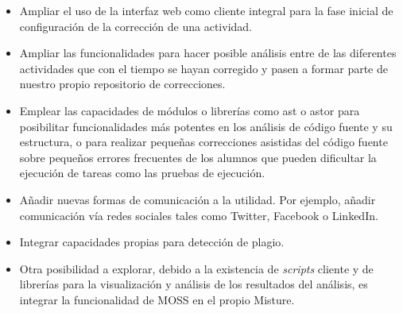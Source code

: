 \begin{itemize}
\item Ampliar el uso de la interfaz web como cliente integral para la fase inicial de configuración de la corrección de una actividad.\\

\item Ampliar las funcionalidades para hacer posible análisis entre de las diferentes actividades que con el tiempo se hayan corregido y pasen a formar parte de nuestro propio repositorio de correcciones.\\

\item Emplear las capacidades de módulos o librerías como ast o astor para posibilitar funcionalidades más potentes en los análisis de código fuente y su estructura, o para realizar pequeñas correcciones asistidas del código fuente sobre pequeños errores frecuentes de los alumnos que pueden dificultar la ejecución de tareas como las pruebas de ejecución.\\

\item Añadir nuevas formas de comunicación a la utilidad. Por ejemplo, añadir comunicación vía redes sociales tales como Twitter, Facebook o LinkedIn.\\

\item Integrar capacidades propias para detección de plagio.\\

\item Otra posibilidad a explorar, debido a la existencia de \textit{scripts} cliente y de librerías para la visualización y análisis de los resultados del análisis, es integrar la funcionalidad de MOSS en el propio Misture.\\
\end{itemize}
